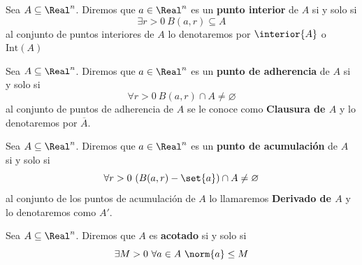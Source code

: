 \begin{frame}
\begin{defn}
Sea $A\subseteq\Real^n$. Diremos que $a\in\Real^n$ es un \textbf{punto interior} de $A$ si y solo si
$$\exists r>0\ B(a,r)\subseteq A$$
al conjunto de puntos interiores de $A$ lo denotaremos por $\interior{A}$ o $\text{Int}(A)$
\end{defn}
\end{frame}

\begin{frame}
\begin{defn}
  Sea $A\subseteq\Real^n$. Diremos que $a\in\Real^n$ es un \textbf{punto de adherencia} de $A$ si y solo si
  $$\forall r>0\ B(a,r)\cap A\neq\varnothing$$
  al conjunto de puntos de adherencia de $A$ se le conoce como \textbf{Clausura de $A$} y lo denotaremos por $\overline{A}$.
\end{defn}
\end{frame}

\begin{frame}
\begin{defn}
Sea $A\subseteq\Real^n$. Diremos que $a\in\Real^n$ es un \textbf{punto de acumulación} de $A$ si y solo si
$$\forall r>0\ (B(a,r)-\set{a})\cap A\neq\varnothing$$
al conjunto de los puntos de acumulación de $A$ lo llamaremos \textbf{Derivado de $A$} y lo denotaremos como $A'$.
\end{defn}
\end{frame}

\begin{frame}
\begin{defn}
  Sea $A\subseteq\Real^n$. Diremos que $A$ es \textbf{acotado} si y solo si 
  $$\exists M>0\ \forall a\in A\ \norm{a}\leq M$$
\end{defn}
\end{frame}

